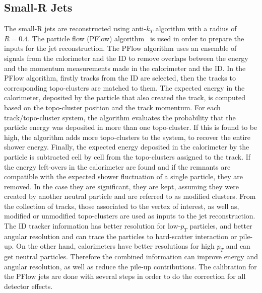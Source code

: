\subsection{Small-R Jets}
\label{subsec:sRjets}
The small-R jets are reconstructed using anti-$k_T$ algorithm with a radius of $R = 0.4$. The particle flow (PFlow) algorithm~\cite{PERF-2015-09} is used in order to prepare the inputs for the jet reconstruction.
The PFlow algorithm uses an ensemble of signals from the calorimeter and the ID to remove overlaps between the energy and the momentum measurements made in the calorimeter and the ID.
In the PFlow algorithm, firstly tracks from the ID are selected, then the tracks to corresponding topo-clusters are matched to them. 
The expected energy in the calorimeter, deposited by the particle that also created the track, is computed based on the topo-cluster position and the track momentum. For each track/topo-cluster system, the algorithm evaluates the probability that the particle energy was deposited in more than one topo-cluster. If this is found to be high, the algorithm adds more topo-clusters to the system, to recover the entire shower energy.
Finally, the expected energy deposited in the calorimeter by the particle is subtracted cell by cell from the topo-clusters assigned to the track.
If the energy left-overs in the calorimeter are found and if the remnants are compatible with the expected shower fluctuation of a single particle, they are removed. In the case they are significant, they are kept, assuming they were created by another neutral particle and are referred to as modified clusters. From the collection of tracks, those associated to the vertex of interest, as well as, modified or unmodified topo-clusters are used as inputs to the jet reconstruction.
The ID tracker information has better resolution for low-$p_T$ particles, and better angular resolution and can trace the particles to hard-scatter
interaction or pile-up. On the other hand, calorimeters have better resolutions for high $p_T$ and can get neutral particles. 
Therefore the combined information can improve energy and angular resolution, as well as reduce the pile-up contributions.
The calibration for the PFlow jets are done with several steps in order to do the correction for all detector effects. 
